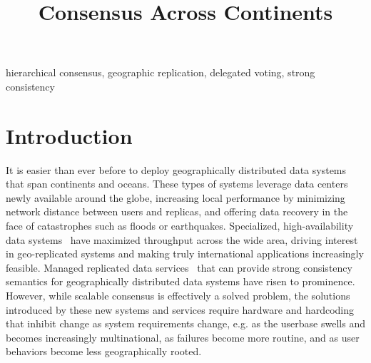 \documentclass[11pt,conference]{IEEEtran}
\begin{document}
\title{Consensus Across Continents}

\author{
}

\maketitle

\begin{abstract}
    
\end{abstract}

\begin{IEEEkeywords}
hierarchical consensus, geographic replication, delegated voting, strong consistency
\end{IEEEkeywords}

\section{Introduction}

It is easier than ever before to deploy geographically distributed data systems
that span continents and oceans.
These types of systems leverage data centers newly available around the globe,
increasing local performance by minimizing network distance between users and
replicas, and offering data recovery in the face of catastrophes such as floods or
earthquakes.
Specialized, high-availability data systems~\cite{megastore,tao,akkio,dynamic_placement}
have maximized throughput across the wide area, driving interest in
geo-replicated systems and making truly international applications increasingly
feasible.
Managed replicated data services~\cite{spanner,aurora,cockroachdb} that can provide
strong consistency semantics for geographically distributed data systems have risen to
prominence.
However, while scalable consensus is effectively a solved problem, the solutions
introduced by these new systems and services require hardware and hardcoding that
inhibit change as system requirements change, e.g. as the userbase swells and becomes
increasingly multinational, as failures become more routine, and as user behaviors
become less geographically rooted.
\end{document}
